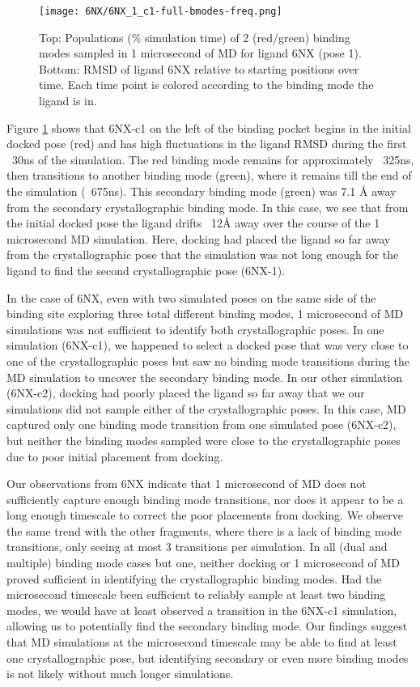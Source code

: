 \documentclass[journal=jcisd8,manuscript=article]{achemso}
\begin{document}
\begin{figure}
    \centering
    \texttt{[image: 6NX/6NX\_1\_c1-full-bmodes-freq.png]}
    \caption[Ligand 6NX pose 1 Binding Mode Populations]{Top: Populations (\% simulation time) of 2 (red/green) binding modes sampled in 1 microsecond of MD for ligand 6NX (pose 1). Bottom: RMSD of ligand 6NX relative to starting positions over time. Each time point is colored according to the binding mode the ligand is in.}
    \label{fig:6NX_c1_bmodes}
\end{figure}

Figure \ref{fig:6NX_c1_bmodes} shows that 6NX-c1 on the left of the binding pocket begins in the initial docked pose (red) and has high fluctuations in the ligand RMSD during the first ~30ns of the simulation.
The red binding mode remains for approximately ~325ns, then transitions to another binding mode (green), where it remains till the end of the simulation (~675ns).
This secondary binding mode (green) was 7.1 {\AA} away from the secondary crystallographic binding mode.
In this case, we see that from the initial docked pose the ligand drifts ~12{\AA} away over the course of the 1 microsecond MD simulation.
Here, docking had placed the ligand so far away from the crystallographic pose that the simulation was not long enough for the ligand to find the second crystallographic pose (6NX-1).

In the case of 6NX, even with two simulated poses on the same side of the binding site exploring three total different binding modes, 1 microsecond of MD simulations was not sufficient to identify both crystallographic poses.
In one simulation (6NX-c1), we happened to select a docked pose that was very close to one of the crystallographic poses but saw no binding mode transitions during the MD simulation to uncover the secondary binding mode.
In our other simulation (6NX-c2), docking had poorly placed the ligand so far away that we our simulations did not sample either of the crystallographic poses.
In this case, MD captured only one binding mode transition from one simulated pose (6NX-c2), but neither the binding modes sampled were close to the crystallographic poses due to poor initial placement from docking. 

Our observations from 6NX indicate that 1 microsecond of MD does not sufficiently capture enough binding mode transitions, nor does it appear to be a long enough timescale to correct the poor placements from docking.
We observe the same trend with the other fragments, where there is a lack of binding mode transitions, only seeing at most 3 transitions per simulation.
In all (dual and multiple) binding mode cases but one, neither docking or 1 microsecond of MD proved sufficient in identifying the crystallographic binding modes.
Had the microsecond timescale been sufficient to reliably sample at least two binding modes, we would have at least observed a transition in the 6NX-c1 simulation, allowing us to potentially find the secondary binding mode.
Our findings suggest that MD simulations at the microsecond timescale may be able to find at least one crystallographic pose, but identifying secondary or even more binding modes is not likely without much longer simulations. 
\end{document}
